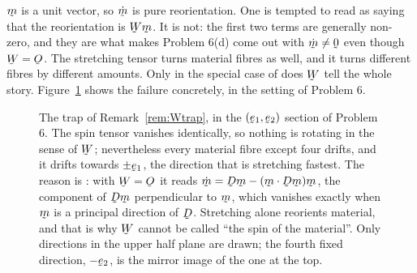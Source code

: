 \begin{remark}
\label{rem:Wtrap}
$\bm$ is a unit vector, so $\dot\bm$ is pure reorientation. One is
tempted to read  as saying that the reorientation is $\bW\bm$.
It is not: the first two terms are generally non-zero, and they are what
makes Problem 6(d) come out with $\dot\bm\neq\bze$ even though
$\bW=\Ob$. The stretching tensor turns material fibres as well, and it
turns different fibres by different amounts. Only in the special case of
 does $\bW$ tell the whole story. Figure~\ref{fig:Wtrapfig}
shows the failure concretely, in the setting of Problem 6.
\end{remark}

\begin{figure}[htbp]\centering
\renewcommand{\thefigure}{D}
\caption{The trap of Remark~\ref{rem:Wtrap}, in the $(\be_{1},\be_{2})$
section of Problem 6. The spin tensor vanishes identically, so nothing is
rotating in the sense of $\bW$; nevertheless every material fibre except
four drifts, and it drifts towards $\pm\be_{1}$, the direction that is
stretching fastest. The reason is : with $\bW=\Ob$ it reads
$\dot\bm=\bD\bm-(\bm\cdot\bD\bm)\bm$, the component of $\bD\bm$
perpendicular to $\bm$, which vanishes exactly when $\bm$ is a principal
direction of $\bD$. Stretching alone reorients material, and that is why
$\bW$ cannot be called ``the spin of the material''. Only directions in
the upper half plane are drawn; the fourth fixed direction, $-\be_{2}$,
is the mirror image of the one at the top.}
\label{fig:Wtrapfig}
\end{figure}

